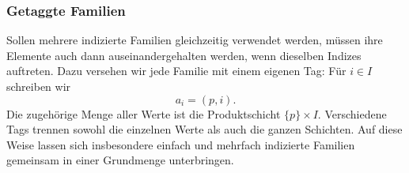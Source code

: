 \documentclass[main.tex]{subfiles}
\begin{document}
\begin{tabproofwide}
    {}
    {}
    {}
    {}
\end{tabproofwide}


\begin{tabproof}
\end{tabproof}

\begin{tabproof}
\end{tabproof}


\begin{tabproof}
\end{tabproof}

\subsubsection{Getaggte Familien}

Sollen mehrere indizierte Familien gleichzeitig verwendet werden, müssen
ihre Elemente auch dann auseinandergehalten werden, wenn dieselben Indizes
auftreten. Dazu versehen wir jede Familie mit einem eigenen Tag: Für
\(i\in I\) schreiben wir
\[
  a_i=(p,i).
\]
Die zugehörige Menge aller Werte ist die Produktschicht
\(\{p\}\times I\). Verschiedene Tags trennen sowohl die einzelnen Werte
als auch die ganzen Schichten. Auf diese Weise lassen sich insbesondere
einfach und mehrfach indizierte Familien gemeinsam in einer Grundmenge
unterbringen.
\end{document}
